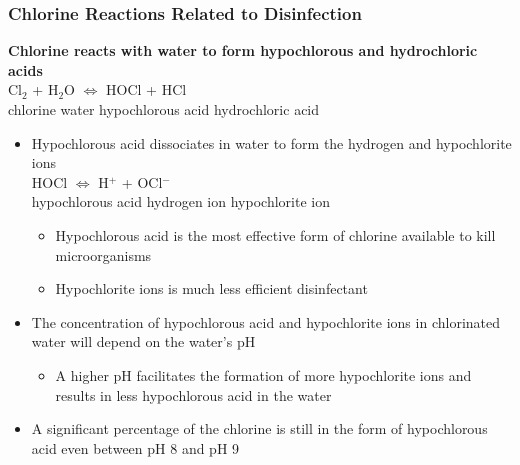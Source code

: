 \documentclass{article}
\begin{document}
\subsubsection{Chlorine Reactions Related to Disinfection}
\textbf{Chlorine reacts with water to form hypochlorous and hydrochloric acids}\\
Cl$_2$ \hspace{0.8cm}	+ \hspace{0.3 cm}	 H$_2$O		\hspace{0.8cm} $\iff$ 
\hspace{0.8cm} HOCl	\hspace{0.8cm}	 +	\hspace{0.8cm}	 HCl \\
chlorine \hspace{0.8cm}	water \hspace{1.8cm}		 hypochlorous acid	\hspace{0.1cm}	 hydrochloric acid\\ 
	\vspace{0.5cm}
	\begin{itemize}
		\item Hypochlorous acid dissociates in water to form the hydrogen and hypochlorite ions\\
 HOCl \hspace{1.8 cm} $\iff$ \hspace{1.8 cm} H$^+$ \hspace{1.8cm} + 	\hspace{0.8cm}OCl$^-$\\ 
hypochlorous acid  \hspace{1.9 cm}      hydrogen ion   \hspace{1.5cm}           hypochlorite ion

		\begin{itemize}
			\item Hypochlorous acid is the most effective form of chlorine available to kill microorganisms
			\item Hypochlorite ions is much less efficient disinfectant
		\end{itemize}

		\item The concentration of hypochlorous acid and hypochlorite ions in chlorinated water will depend on the water's pH
		\begin{itemize}
			\item A higher pH facilitates the formation of more hypochlorite ions and results in less hypochlorous acid in the water
		\end{itemize}
		\item A significant percentage of the chlorine is still in the form of hypochlorous acid even between pH 8 and pH 9
		\end{itemize}
\end{document}

